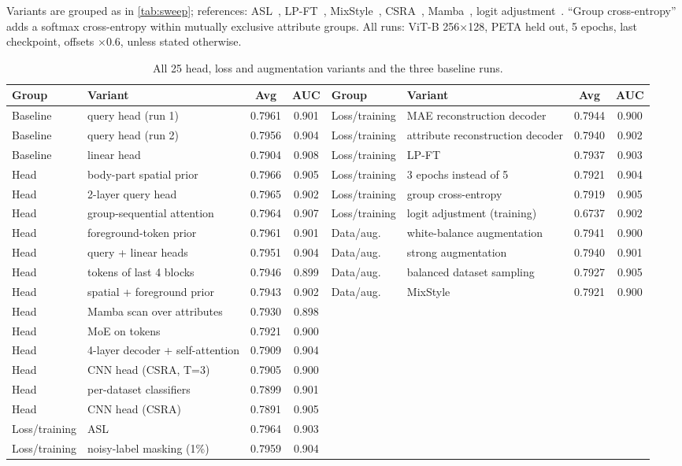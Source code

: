 \documentclass[10pt,twocolumn,letterpaper]{article}
\begin{document}
Variants are grouped as in \cref{tab:sweep}; references: ASL~\cite{asl}, LP-FT~\cite{lpft}, MixStyle~\cite{mixstyle}, CSRA~\cite{csra}, Mamba~\cite{mamba}, logit adjustment~\cite{logitadj}. ``Group cross-entropy'' adds a softmax cross-entropy within mutually exclusive attribute groups. All runs: ViT-B 256$\times$128, PETA held out, 5 epochs, last checkpoint, offsets $\times0.6$, unless stated otherwise.

\begin{table}[h]
\centering\small
\begin{tabular}{@{}llcc|llcc@{}}
\toprule
Group & Variant & Avg & AUC & Group & Variant & Avg & AUC \\
\midrule
Baseline & query head (run 1) & 0.7961 & 0.901 & Loss/training & MAE reconstruction decoder & 0.7944 & 0.900 \\
Baseline & query head (run 2) & 0.7956 & 0.904 & Loss/training & attribute reconstruction decoder & 0.7940 & 0.902 \\
Baseline & linear head & 0.7904 & 0.908 & Loss/training & LP-FT & 0.7937 & 0.903 \\
Head & body-part spatial prior & 0.7966 & 0.905 & Loss/training & 3 epochs instead of 5 & 0.7921 & 0.904 \\
Head & 2-layer query head & 0.7965 & 0.902 & Loss/training & group cross-entropy & 0.7919 & 0.905 \\
Head & group-sequential attention & 0.7964 & 0.907 & Loss/training & logit adjustment (training) & 0.6737 & 0.902 \\
Head & foreground-token prior & 0.7961 & 0.901 & Data/aug. & white-balance augmentation & 0.7941 & 0.900 \\
Head & query + linear heads & 0.7951 & 0.904 & Data/aug. & strong augmentation & 0.7940 & 0.901 \\
Head & tokens of last 4 blocks & 0.7946 & 0.899 & Data/aug. & balanced dataset sampling & 0.7927 & 0.905 \\
Head & spatial + foreground prior & 0.7943 & 0.902 & Data/aug. & MixStyle & 0.7921 & 0.900 \\
Head & Mamba scan over attributes & 0.7930 & 0.898 & & & & \\
Head & MoE on tokens & 0.7921 & 0.900 & & & & \\
Head & 4-layer decoder + self-attention & 0.7909 & 0.904 & & & & \\
Head & CNN head (CSRA, T=3) & 0.7905 & 0.900 & & & & \\
Head & per-dataset classifiers & 0.7899 & 0.901 & & & & \\
Head & CNN head (CSRA) & 0.7891 & 0.905 & & & & \\
Loss/training & ASL & 0.7964 & 0.903 & & & & \\
Loss/training & noisy-label masking (1\%) & 0.7959 & 0.904 & & & & \\
\bottomrule
\end{tabular}
\caption{All 25 head, loss and augmentation variants and the three baseline runs.}
\end{table}
\end{document}
